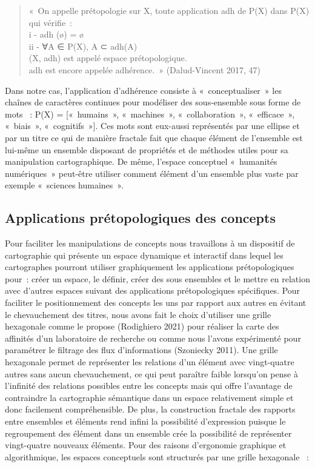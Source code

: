 \documentclass[
  letterpaper,
  DIV=11,
  numbers=noendperiod]{scrreprt}
\begin{document}
\begin{quote}
«~On appelle prétopologie sur X, toute application adh de P(X) dans P(X)
qui vérifie~:\\
i - adh (ø) = ø\\
ii - ∀A ∈ P(X), A ⊂ adh(A)\\
(X, adh) est appelé espace prétopologique.\\
adh est encore appelée adhérence.~» (Dalud-Vincent 2017, 47)
\end{quote}

Dans notre cas, l'application d'adhérence consiste à «~conceptualiser~»
les chaînes de caractères continues pour modéliser des sous-ensemble
sous forme de mots ~: P(X) = {[}«~humains~», «~machines~»,
«~collaboration~», «~efficace~», «~biais~», «~cognitifs~»{]}. Ces mots
sont eux-aussi représentés par une ellipse et par un titre ce qui de
manière fractale fait que chaque élément de l'ensemble est lui-même un
ensemble disposant de propriétés et de méthodes utiles pour sa
manipulation cartographique. De même, l'espace conceptuel «~humanités
numériques~» peut-être utiliser comment élément d'un ensemble plus vaste
par exemple «~sciences humaines~».

\hypertarget{sec-applicationsPretopologique}{%
\subsection{Applications prétopologiques des
concepts}\label{sec-applicationsPretopologique}}

Pour faciliter les manipulations de concepts nous travaillons à un
dispositif de cartographie qui présente un espace dynamique et
interactif dans lequel les cartographes pourront utiliser graphiquement
les applications prétopologiques pour~: créer un espace, le définir,
créer des sous ensembles et le mettre en relation avec d'autres espaces
suivant des applications prétopologiques spécifiques. Pour faciliter le
positionnement des concepts les uns par rapport aux autres en évitant le
chevauchement des titres, nous avons fait le choix d'utiliser une grille
hexagonale comme le propose (Rodighiero 2021) pour réaliser la carte des
affinités d'un laboratoire de recherche ou comme nous l'avons
expérimenté pour paramétrer le filtrage des flux d'informations
(Szoniecky 2011). Une grille hexagonale permet de représenter les
relations d'un élément avec vingt-quatre autres sans aucun
chevauchement, ce qui peut paraître faible lorsqu'on pense à l'infinité
des relations possibles entre les concepts mais qui offre l'avantage de
contraindre la cartographie sémantique dans un espace relativement
simple et donc facilement compréhensible. De plus, la construction
fractale des rapports entre ensembles et éléments rend infini la
possibilité d'expression puisque le regroupement des élément dans un
ensemble crée la possibilité de représenter vingt-quatre nouveaux
éléments. Pour des raisons d'ergonomie graphique et algorithmique, les
espaces conceptuels sont structurés par une grille hexagonale ~:
\end{document}
